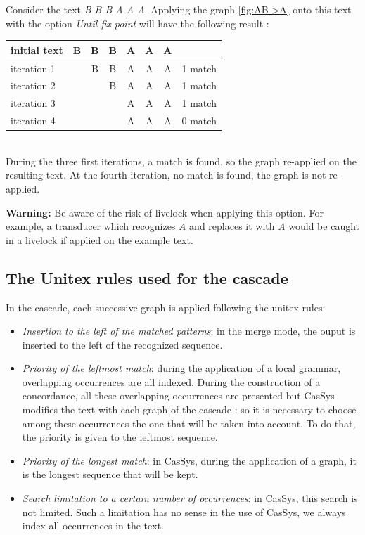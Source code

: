 Consider the text \emph{B B B A A A}. Applying the graph \ref{fig:AB->A} onto this text with the option \emph{Until fix point} will have the following result :\\

\begin{tabular}{|l|cccccc|r|}
\hline
initial text  &B&B&B&A&A&A&\\
\hline
iteration 1 & &B&B&A&A&A& 1 match\\
iteration 2 & & &B&A&A&A& 1 match\\
iteration 3 & & & &A&A&A& 1 match\\
iteration 4 & & & &A&A&A& 0 match\\
\hline
\end{tabular} \\

During the three first iterations, a match is found, so the graph
re-applied on the resulting text. At the fourth iteration, no match is
found, the graph is not re-applied.

\large{\textbf{Warning:}} Be aware of the risk of livelock when applying this
option. For example, a transducer which recognizes \emph{A} and replaces it with
\emph{A} would be caught in a livelock if applied on the example text.

\subsection{The Unitex rules used for the cascade}

In the cascade, each successive graph is applied following the unitex rules:
\begin{itemize}
	\item \textit{Insertion to the left of the matched patterns}: in the merge mode, the ouput is inserted to the left of the recognized sequence.
	\item	\textit{Priority of the leftmost match}: during the application of a local grammar, overlapping occurrences are all indexed. 
	During the construction of a concordance, all these overlapping occurrences are presented but CasSys modifies the text with each 
	graph of the cascade : so it is necessary to choose among these occurrences the one that will be taken into account. To do that, the priority is given to the leftmost sequence.
	\item \textit{Priority of the longest match}: in CasSys, during the application of a graph, it is the longest sequence 
	that will be kept.
	\item	\textit{Search limitation to a certain number of occurrences}: in CasSys, this search is not limited. Such a limitation has no sense in the use of CasSys, we always index all occurrences in the text.
\end{itemize}


